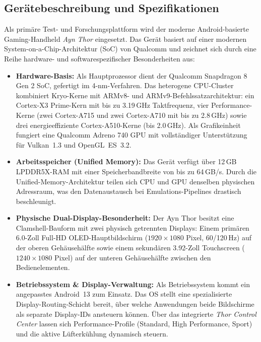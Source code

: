 \documentclass[12pt,a4paper]{scrartcl}
\begin{document}
\subsection{Gerätebeschreibung und Spezifikationen}
Als primäre Test- und Forschungsplattform wird der moderne Android-basierte Gaming-Handheld \textit{Ayn Thor} eingesetzt. Das Gerät basiert auf einer modernen System-on-a-Chip-Architektur (SoC) von Qualcomm und zeichnet sich durch eine Reihe hardware- und softwarespezifischer Besonderheiten aus:

\begin{itemize}[leftmargin=1.8em]
    \item \textbf{Hardware-Basis:} Als Hauptprozessor dient der Qualcomm Snapdragon 8 Gen 2 SoC, gefertigt im 4-nm-Verfahren. Das heterogene CPU-Cluster kombiniert Kryo-Kerne mit ARMv8- und ARMv9-Befehlssatzarchitektur: ein Cortex-X3 Prime-Kern mit bis zu 3.19\,GHz Taktfrequenz, vier Performance-Kerne (zwei Cortex-A715 und zwei Cortex-A710 mit bis zu 2.8\,GHz) sowie drei energieeffiziente Cortex-A510-Kerne (bis 2.0\,GHz). Als Grafikeinheit fungiert eine Qualcomm Adreno 740 GPU mit vollständiger Unterstützung für Vulkan~1.3 und OpenGL~ES~3.2.
    \item \textbf{Arbeitsspeicher (Unified Memory):} Das Gerät verfügt über 12\,GB LPDDR5X-RAM mit einer Speicherbandbreite von bis zu 64\,GB/s. Durch die Unified-Memory-Architektur teilen sich CPU und GPU denselben physischen Adressraum, was den Datenaustausch bei Emulations-Pipelines drastisch beschleunigt.
    \item \textbf{Physische Dual-Display-Besonderheit:} Der Ayn Thor besitzt eine Clamshell-Bauform mit zwei physisch getrennten Displays: Einem primären 6.0-Zoll Full-HD OLED-Hauptbildschirm ($1920\times1080$ Pixel, 60/120\,Hz) auf der oberen Gehäusehälfte sowie einem sekundären 3.92-Zoll Touchscreen ($1240\times1080$ Pixel) auf der unteren Gehäusehälfte zwischen den Bedienelementen.
    \item \textbf{Betriebssystem \& Display-Verwaltung:} Als Betriebssystem kommt ein angepasstes Android~13 zum Einsatz. Das OS stellt eine spezialisierte Display-Routing-Schicht bereit, über welche Anwendungen beide Bildschirme als separate Display-IDs ansteuern können. Über das integrierte \textit{Thor Control Center} lassen sich Performance-Profile (Standard, High Performance, Sport) und die aktive Lüfterkühlung dynamisch steuern.
\end{itemize}
\end{document}
